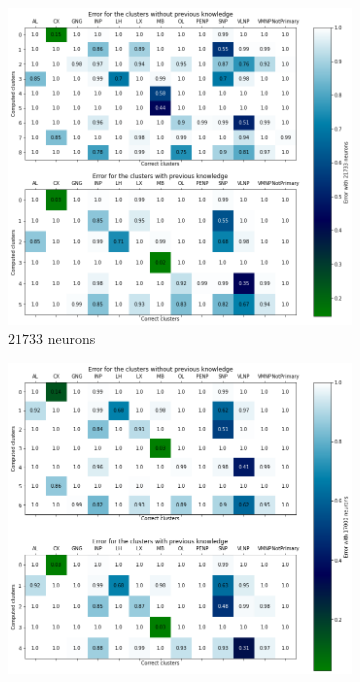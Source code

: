 \begin{figure}
	\centering
	\begin{subfigure}[b]{0.49\textwidth}
		\centering
		\includegraphics[width=\textwidth]{Images/Communities/Error_comm_21733.png}
		\caption{$21733$ neurons}
	\end{subfigure}
	\hfill
	\begin{subfigure}[b]{0.49\textwidth}
		\centering
		\includegraphics[width=\textwidth]{Images/Communities/Error_comm_17000.png}

\end{subfigure}
\end{figure}
